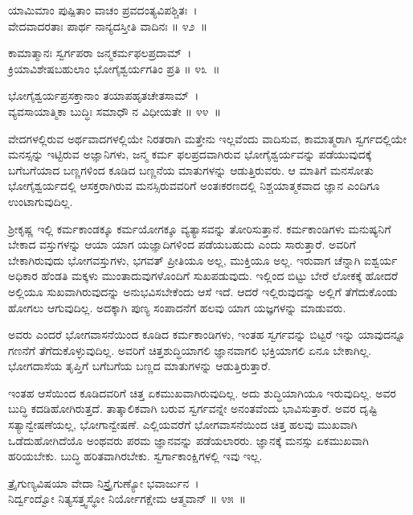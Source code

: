 \begin{shloka}
ಯಾಮಿಮಾಂ ಪುಷ್ಪಿತಾಂ ವಾಚಂ ಪ್ರವದಂತ್ಯವಿಪಶ್ಚಿತಃ~।\\ವೇದವಾದರತಾಃ ಪಾರ್ಥ ನಾನ್ಯದಸ್ತೀತಿ ವಾದಿನಃ \hfill॥ ೪೨~॥
\end{shloka}

\begin{shloka}
ಕಾಮಾತ್ಮಾನಃ ಸ್ವರ್ಗಪರಾ ಜನ್ಮಕರ್ಮಫಲಪ್ರದಾಮ್~।\\ಕ್ರಿಯಾವಿಶೇಷಬಹುಲಾಂ ಭೋಗೈಶ್ವರ್ಯಗತಿಂ ಪ್ರತಿ \hfill॥ ೪೩~॥
\end{shloka}

\begin{shloka}
ಭೋಗೈಶ್ವರ್ಯಪ್ರಸಕ್ತಾನಾಂ ತಯಾಪಹೃತಚೇತಸಾಮ್~।\\ವ್ಯವಸಾಯಾತ್ಮಿಕಾ ಬುದ್ಧಿಃ ಸಮಾಧೌ ನ ವಿಧೀಯತೇ \hfill॥ ೪೪~॥
\end{shloka}

\begin{artha}
ವೇದಗಳಲ್ಲಿರುವ ಅರ್ಥವಾದಗಳಲ್ಲಿಯೇ ನಿರತರಾಗಿ ಮತ್ತೇನು ಇಲ್ಲವೆಂದು ವಾದಿಸುವ, ಕಾಮಾತ್ಮ\-ರಾಗಿ ಸ್ವರ್ಗದಲ್ಲಿಯೇ ಮನಸ್ಸನ್ನು ಇಟ್ಟಿರುವ ಅಜ್ಞಾನಿಗಳು, ಜನ್ಮ ಕರ್ಮ ಫಲಪ್ರದವಾಗಿರುವ ಭೋಗೈಶ್ವರ್ಯವನ್ನು ಪಡೆಯುವುದಕ್ಕೆ ಬಗೆಬಗೆಯಾದ ಬಣ್ಣಗಳಿಂದ ಕೂಡಿದ ಬಣ್ಣನೆಯ ಮಾತುಗಳನ್ನು ಆಡುತ್ತಿರುವರು. ಆ ಮಾತಿಗೆ ಮನಸೋತು ಭೋಗೈಶ್ವರ್ಯದಲ್ಲಿ ಆಸಕ್ತರಾಗಿರುವ ಮನಸ್ಸಿರುವವರಿಗೆ ಅಂತಃಕರಣದಲ್ಲಿ ನಿಶ್ಚಯಾತ್ಮಕವಾದ ಜ್ಞಾನ ಎಂದಿಗೂ ಉಂಟಾಗುವುದಿಲ್ಲ.
\end{artha}

ಶ‍್ರೀಕೃಷ್ಣ ಇಲ್ಲಿ ಕರ್ಮಕಾಂಡಕ್ಕೂ ಕರ್ಮಯೋಗಕ್ಕೂ ವ್ಯತ್ಯಾಸವನ್ನು ತೋರಿಸುತ್ತಾನೆ. ಕರ್ಮ\-ಕಾಂಡಿಗಳು ಮನುಷ್ಯನಿಗೆ ಬೇಕಾದ ವಸ್ತುಗಳನ್ನು ಆಯಾ ಯಾಗ ಯಜ್ಞಾದಿಗಳಿಂದ ಪಡೆಯ\-ಬಹುದು ಎಂದು ಸಾರುತ್ತಾರೆ. ಅವರಿಗೆ ಬೇಕಾಗಿರುವುದು ಭೋಗವಸ್ತುಗಳು, ಭಗವತ್ ಪ್ರೀತಿಯೂ ಅಲ್ಲ, ಮುಕ್ತಿಯೂ ಅಲ್ಲ. ಇರುವಾಗ ಚೆನ್ನಾಗಿ ಐಶ್ವರ್ಯ ಅಧಿಕಾರ ಹೆಂಡತಿ ಮಕ್ಕಳು ಮುಂತಾದುವು\-ಗಳೊಂದಿಗೆ ಸುಖಪಡುವುದು. ಇಲ್ಲಿಂದ ಬಿಟ್ಟು ಬೇರೆ ಲೋಕಕ್ಕೆ ಹೋದರೆ ಅಲ್ಲಿಯೂ ಸುಖವಾಗಿರುವುದನ್ನು ಅನುಭವಿಸಬೇಕೆಂದು ಆಸೆ ಇದೆ. ಆದರೆ ಇಲ್ಲಿರುವುದನ್ನು ಅಲ್ಲಿಗೆ ತೆಗೆದುಕೊಂಡು ಹೋಗಲು ಆಗುವುದಿಲ್ಲ. ಅದಕ್ಕಾಗಿ ಪುಣ್ಯ ಸಂಪಾದನೆಗೆ ಹಲವು ಯಾಗ ಯಜ್ಞಗಳನ್ನು ಮಾಡುವರು.

ಅವರು ಎಂದರೆ ಭೋಗವಾಸನೆಯಿಂದ ಕೂಡಿದ ಕರ್ಮಕಾಂಡಿಗಳು, ಇಂತಹ ಸ್ವರ್ಗವನ್ನು ಬಿಟ್ಟರೆ ಇನ್ನು ಯಾವುದನ್ನೂ ಗಣನೆಗೆ ತೆಗೆದುಕೊಳ್ಳುವುದಿಲ್ಲ. ಅವರಿಗೆ ಚಿತ್ತಶುದ್ಧಿಯಾಗಲಿ ಜ್ಞಾನವಾಗಲಿ ಭಕ್ತಿಯಾಗಲಿ ಏನೂ ಬೇಕಾಗಿಲ್ಲ. ಭೋಗದಾಸೆಯ ತೃಪ್ತಿಗೆ ಬಗೆಬಗೆಯ ಬಣ್ಣದ ಮಾತುಗಳನ್ನು ಆಡುತ್ತಿರುತ್ತಾರೆ.

ಇಂತಹ ಆಸೆಯಿಂದ ಕೂಡಿದವರಿಗೆ ಚಿತ್ತ ಏಕಮುಖವಾಗಿರುವುದಿಲ್ಲ. ಅದು ಶುದ್ಧಿ\-ಯಾಗಿಯೂ ಇರುವುದಿಲ್ಲ. ಅವರ ಬುದ್ಧಿ ಕದಡಿಹೋಗಿರುತ್ತದೆ. ತಾತ್ಕಾಲಿಕವಾಗಿ ಬರುವ ಸ್ವರ್ಗವನ್ನೇ ಅನಂತವೆಂದು ಭಾವಿಸುತ್ತಾರೆ. ಅವರ ದೃಷ್ಟಿ ಸತ್ಯಾನ್ವೇಷಣೆಯಲ್ಲ, ಭೋಗಾನ್ವೇಷಣೆ. ಎಲ್ಲಿಯವರೆಗೆ ಭೋಗವಾಸನೆಯಿಂದ ಚಿತ್ತ ಹಲವು ಮುಖವಾಗಿ ಒಡೆದುಹೋಗಿದೆಯೊ ಅಂಥವರು ಪರಮ ಜ್ಞಾನವನ್ನು ಪಡೆಯಲಾರರು. ಜ್ಞಾನಕ್ಕೆ ಮನಸ್ಸು ಏಕಮುಖವಾಗಿ ಹರಿಯಬೇಕು. ಬುದ್ಧಿ ಹರಿತವಾಗಿರಬೇಕು. ಸ್ವರ್ಗಾಕಾಂಕ್ಷಿಗಳಲ್ಲಿ ಇವು ಇಲ್ಲ.

\begin{shloka}
ತ್ರೈಗುಣ್ಯವಿಷಯಾ ವೇದಾ ನಿಸ್ತ್ರೈಗುಣ್ಯೋ ಭವಾರ್ಜುನ~।\\ನಿರ್ದ್ವಂದ್ವೋ ನಿತ್ಯಸತ್ತ್ವಸ್ಥೋ ನಿರ್ಯೋಗಕ್ಷೇಮ ಆತ್ಮವಾನ್ \hfill॥ ೪೫~॥
\end{shloka}

